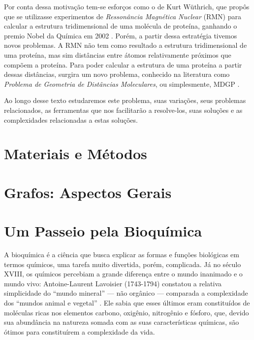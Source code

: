 \documentclass[a4paper,12pt]{article}
\begin{document}
	Por conta dessa motivação tem-se esforços como o de Kurt Wüthrich, que propôs que se utilizasse experimentos de \textit{Ressonância Magnética Nuclear}
	(RMN) para calcular a estrutura tridimensional de uma molécula de proteína, ganhando o premio Nobel da Química em 2002 \cite{RMNproteinWrutrich}. Porém, a partir dessa estratégia tivemos novos problemas. A RMN não tem como resultado a estrutura tridimensional de uma proteína, mas sim distâncias entre átomos relativamente próximos que compõem a proteína. Para poder calcular a estrutura de uma proteína a partir dessas distâncias, surgira um novo problema, conhecido na literatura como \textit{Problema de Geometria de Distâncias Moleculares}, ou simplesmente, MDGP \cite{carlileGDandAplications}.
	
	Ao longo desse texto estudaremos este problema, suas variações, seus problemas relacionados, as ferramentas que nos facilitarão a resolve-los, suas soluções e as complexidades relacionadas a estas soluções.
	
	\newpage

	\section{Materiais e Métodos}
	
	\newpage
	
	\section{Grafos: Aspectos Gerais}
	
	\newpage
	
	\section{Um Passeio pela Bioquímica}
	A bioquímica é a ciência que busca explicar as formas e funções biológicas em termos químicos, uma tarefa muito divertida, porém, complicada. Já no século XVIII, os químicos percebiam a grande diferença entre o mundo inanimado e o mundo vivo: Antoine-Laurent Lavoisier (1743-1794) constatou a relativa simplicidade do ``mundo mineral'' --- não orgânico --- comparada a complexidade dos ``mundos animal e vegetal'' \cite{bioquimicaLehninger}. Ele sabia que esses últimos eram constituídos de moléculas ricas nos elementos carbono, oxigênio, nitrogênio e fósforo, que, devido sua abundância na natureza somada com as suas características químicas, são ótimos para constituírem a complexidade da vida.
\end{document}
